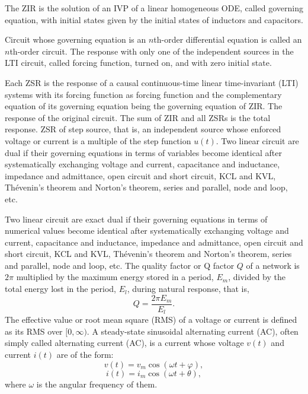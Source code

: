 \documentclass[a4paper,12pt]{article}
\begin{document}
The ZIR is the solution of an IVP of a linear homogeneous ODE, called governing equation, with initial states given by the initial states of inductors and capacitors.

Circuit whose governing equation is an $n$th-order differential equation is called an $n$th-order circuit.
The response with only one of the independent sources in the LTI circuit, called forcing function, turned on, and with zero initial state.

Each ZSR is the response of a causal continuous-time linear time-invariant (LTI) systems with its forcing function as forcing function and the complementary equation of its governing equation being the governing equation of ZIR.
The response of the original circuit.
The sum of ZIR and all ZSRs is the total response.
ZSR of step source, that is, an independent source whose enforced voltage or current is a multiple of the step function $u(t)$.
Two linear circuit are dual if their governing equations in terms of variables become identical after systematically exchanging voltage and current, capacitance and inductance, impedance and admittance, open circuit and short circuit, KCL and KVL, Thévenin's theorem and Norton's theorem, series and parallel, node and loop, etc.

Two linear circuit are exact dual if their governing equations in terms of numerical values become identical after systematically exchanging voltage and current, capacitance and inductance, impedance and admittance, open circuit and short circuit, KCL and KVL, Thévenin's theorem and Norton's theorem, series and parallel, node and loop, etc.
The quality factor or Q factor $Q$ of a network is $2\pi$ multiplied by the maximum energy stored in a period, $E_m$, divided by the total energy lost in the period, $E_l$, during natural response, that is,
\[Q=\frac{2\pi E_m}{E_l}.\]
The effective value or root mean square (RMS) of a voltage or current is defined as its RMS over $[0,\infty)$.
A steady-state sinusoidal alternating current (AC), often simply called alternating current (AC), is a current whose voltage $v(t)$ and current $i(t)$ are of the form:
\[v(t)=v_m\cos(\omega t+\varphi),\]
\[i(t)=i_m\cos(\omega t+\theta),\]
where $\omega$ is the angular frequency of them.
\end{document}

